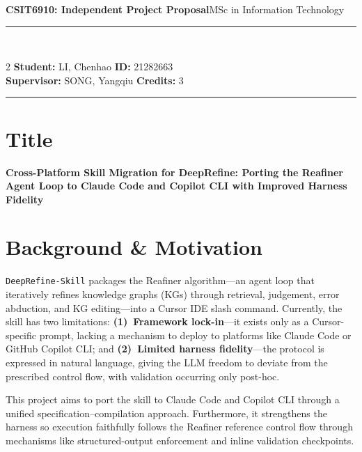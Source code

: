 \documentclass[10pt,a4paper]{article}
\begin{document}
\begin{center}
{\large\textbf{CSIT6910: Independent Project Proposal}}\hfill{\small MSc in Information Technology}\\[2pt]
\rule{\textwidth}{0.3pt}\\[2pt]
\begin{multicols}{2}
\textbf{Student:} LI, Chenhao \quad \textbf{ID:} 21282663\\
\columnbreak
\textbf{Supervisor:} SONG, Yangqiu \quad\textbf{Credits:} 3
\end{multicols}
\rule{\textwidth}{0.3pt}
\end{center}

\section{Title}
{\bfseries Cross-Platform Skill Migration for DeepRefine: Porting the Reafiner Agent Loop to Claude Code and Copilot CLI with Improved Harness Fidelity}

\section{Background \& Motivation}
\texttt{DeepRefine-Skill} packages the Reafiner algorithm---an agent loop that iteratively refines knowledge graphs (KGs) through retrieval, judgement, error abduction, and KG editing---into a Cursor IDE slash command. Currently, the skill has two limitations: \textbf{(1)~Framework lock-in}---it exists only as a Cursor-specific prompt, lacking a mechanism to deploy to platforms like Claude Code or GitHub Copilot CLI; and \textbf{(2)~Limited harness fidelity}---the protocol is expressed in natural language, giving the LLM freedom to deviate from the prescribed control flow, with validation occurring only post-hoc.

This project aims to port the skill to Claude Code and Copilot CLI through a unified specification--compilation approach. Furthermore, it strengthens the harness so execution faithfully follows the Reafiner reference control flow through mechanisms like structured-output enforcement and inline validation checkpoints.

\end{document}
